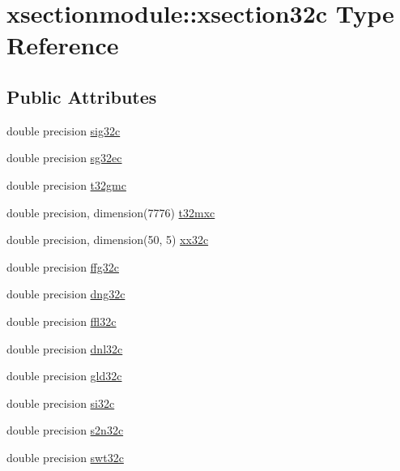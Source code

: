 \hypertarget{structxsectionmodule_1_1xsection32c}{}\section{xsectionmodule\+:\+:xsection32c Type Reference}
\label{structxsectionmodule_1_1xsection32c}
\subsection*{Public Attributes}
\begin{DoxyCompactItemize}
\item 
double precision \hyperlink{structxsectionmodule_1_1xsection32c_a21221e14457f6c61910c9cc0db7b2c07}{sig32c}
\item 
double precision \hyperlink{structxsectionmodule_1_1xsection32c_a905c1d142c0225402e6180c205fccab6}{sg32ec}
\item 
double precision \hyperlink{structxsectionmodule_1_1xsection32c_a4155006c2224be3f253534e77896defa}{t32gmc}
\item 
double precision, dimension(7776) \hyperlink{structxsectionmodule_1_1xsection32c_a2c8f94474dec3ca68718e2f5d6519cda}{t32mxc}
\item 
double precision, dimension(50, 5) \hyperlink{structxsectionmodule_1_1xsection32c_a843c2952237643879bf442f218eb9c91}{xx32c}
\item 
double precision \hyperlink{structxsectionmodule_1_1xsection32c_affc6e386b1b3a41895474e3fc3e818b2}{ffg32c}
\item 
double precision \hyperlink{structxsectionmodule_1_1xsection32c_ab17e16bd0e187b7190bcbb8243c4e811}{dng32c}
\item 
double precision \hyperlink{structxsectionmodule_1_1xsection32c_ae0123db458b9fe4ae4642023f465f4a5}{ffl32c}
\item 
double precision \hyperlink{structxsectionmodule_1_1xsection32c_a98c2897e20060931b3ac56531f8bd677}{dnl32c}
\item 
double precision \hyperlink{structxsectionmodule_1_1xsection32c_a9161d0bafb601152f42154ec56fe4971}{gld32c}
\item 
double precision \hyperlink{structxsectionmodule_1_1xsection32c_aa79e71cb7c82e8cd8b19aa499d4e201f}{si32c}
\item 
double precision \hyperlink{structxsectionmodule_1_1xsection32c_a426ed58da549d03a63c502c8d98ebddc}{s2n32c}
\item 
double precision \hyperlink{structxsectionmodule_1_1xsection32c_a1458db2abf66c9556792484f1a79ea32}{swt32c}

\end{DoxyCompactItemize}
